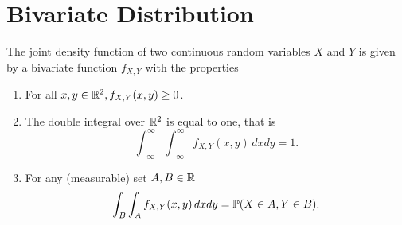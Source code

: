 \section{Bivariate Distribution}
The joint density function of two continuous random variables \(X\) and \(Y\) is given by a bivariate function \(f_{X,Y}\) with the properties
\begin{enumerate}
    \item For all \(x,y \in \mathbb{R}^2, f_{X,Y}(x,y) \geq 0\).
    \item The double integral over \(\mathbb{R}^2\) is equal to one, that is 
    \[\int_{-\infty}^\infty \int_{-\infty}^\infty f_{X,Y}(x,y) \, dxdy = 1.\]
    \item For any (measurable) set \(A,B \in \mathbb{R}\)
    \[\int_B \int_A f_{X,Y}(x,y) \, dxdy = \mathbb{P}(X \in A, Y \in B).\]
\end{enumerate}